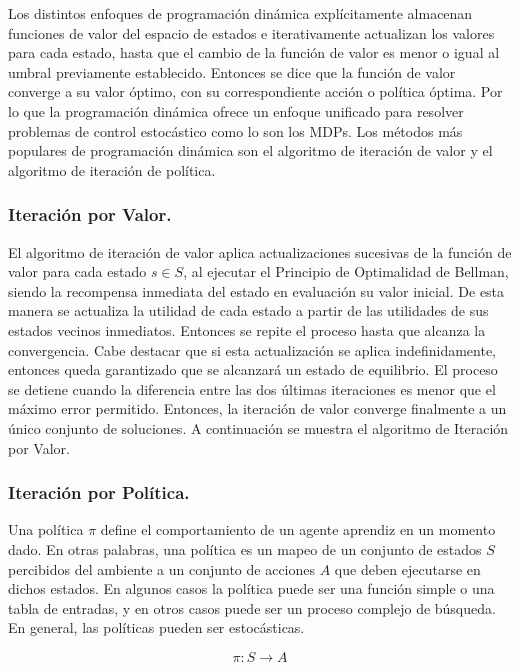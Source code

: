 Los distintos enfoques de programación dinámica explícitamente almacenan funciones de valor del espacio de estados e iterativamente actualizan los valores para cada estado, hasta que el cambio de la función de valor es menor o igual al umbral previamente establecido. Entonces se dice que la función de valor converge a su valor óptimo, con su correspondiente acción o política óptima. Por lo que la programación dinámica ofrece un enfoque unificado para resolver problemas de control estocástico como lo son los MDPs. Los métodos más populares de programación dinámica son el algoritmo de iteración de valor y el algoritmo de iteración de política.

\subsubsection{Iteración por Valor.}
El algoritmo de iteración de valor aplica actualizaciones sucesivas de la función de valor para cada estado $s \in S$, al ejecutar el Principio de Optimalidad de Bellman, siendo la recompensa inmediata del estado en evaluación su valor inicial. De esta manera se actualiza la utilidad de cada estado a partir de las utilidades de sus estados vecinos inmediatos. Entonces se repite el proceso hasta que alcanza la convergencia. Cabe destacar que si esta actualización se aplica indefinidamente, entonces queda garantizado que se alcanzará un estado de equilibrio. El proceso se detiene cuando la diferencia entre las dos últimas iteraciones es menor que el máximo error permitido. Entonces, la iteración de valor converge finalmente a un único conjunto de soluciones. A continuación se muestra el algoritmo de Iteración por Valor.

\subsubsection{Iteración por Política.}

Una política $\pi$ define el comportamiento de un agente aprendiz en un momento dado. En otras palabras, una política es un mapeo de un conjunto de estados $S$ percibidos del ambiente a un conjunto de acciones $A$ que deben ejecutarse en dichos estados. En algunos casos la política puede ser una función simple o una tabla de entradas, y en otros casos puede ser un proceso complejo de búsqueda. En general, las políticas pueden ser estocásticas.

$$\pi : S \rightarrow A$$\\

